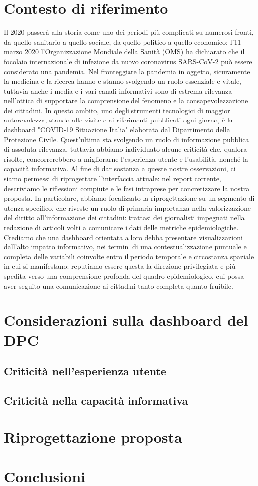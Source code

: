 \documentclass[11pt]{article}
\begin{document}
\section{Contesto di riferimento}
Il 2020 passerà alla storia come uno dei periodi più complicati su numerosi fronti, da quello sanitario a quello sociale, da quello politico a quello economico: l'11 marzo 2020 l'Organizzazione Mondiale della Sanità (OMS) ha dichiarato che il focolaio internazionale di infezione da nuovo coronavirus SARS-CoV-2 può essere considerato una pandemia.
Nel fronteggiare la pandemia in oggetto, sicuramente la medicina e la ricerca hanno e stanno svolgendo un ruolo essenziale e vitale, tuttavia anche i media e i vari canali informativi sono di estrema rilevanza nell'ottica di supportare la comprensione del fenomeno e la consapevolezzazione dei cittadini. In questo ambito, uno degli strumenti tecnologici di maggior autorevolezza, stando alle visite e ai riferimenti pubblicati ogni giorno, è la dashboard "COVID-19 Situazione Italia" elaborata dal Dipartimento della Protezione Civile. Quest'ultima sta svolgendo un ruolo di informazione pubblica di assoluta rilevanza, tuttavia abbiamo individuato alcune criticità che, qualora risolte, concorrerebbero a migliorarne l'esperienza utente e l'usabilità, nonché la capacità informativa.
Al fine di dar sostanza a queste nostre osservazioni, ci siamo permessi di riprogettare l'interfaccia attuale: nel report corrente, descriviamo le riflessioni compiute e le fasi intraprese per concretizzare la nostra proposta. In particolare, abbiamo focalizzato la riprogettazione su un segmento di utenza specifico, che riveste un ruolo di primaria importanza nella valorizzazione del diritto all'informazione dei cittadini: trattasi dei giornalisti impegnati nella redazione di articoli volti a comunicare i dati delle metriche epidemiologiche.
Crediamo che una dashboard orientata a loro debba presentare visualizzazioni dall'alto impatto informativo, nei termini di una contestualizzazione puntuale e completa delle variabili coinvolte entro il periodo temporale e circostanza spaziale in cui si manifestano: reputiamo essere questa la direzione privilegiata e più spedita verso una comprensione profonda del quadro epidemiologico, cui possa aver seguito una comunicazione ai cittadini tanto completa quanto fruibile.

\section{Considerazioni sulla dashboard del DPC}

\subsection{Criticità nell'esperienza utente}
\subsection{Criticità nella capacità informativa}

\section{Riprogettazione proposta}

\section{Conclusioni}




\end{document}
